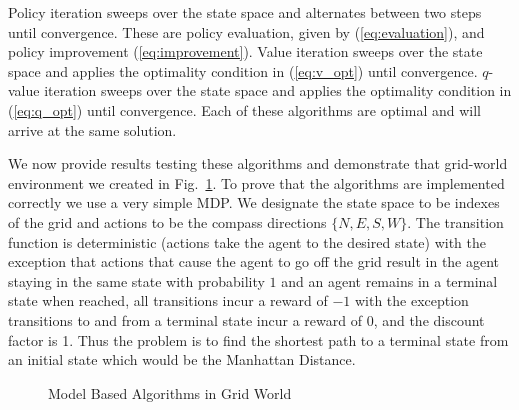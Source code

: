 \documentclass{article}
\begin{document}
Policy iteration sweeps over the state space and alternates between two steps until convergence. These are policy evaluation, given by (\ref{eq:evaluation}), and policy improvement (\ref{eq:improvement}). Value iteration sweeps over the state space and applies the optimality condition in (\ref{eq:v_opt}) until convergence. $q$-value iteration sweeps over the state space and applies the optimality condition in (\ref{eq:q_opt}) until convergence. Each of these algorithms are optimal and will arrive at the same solution.

We now provide results testing these algorithms and demonstrate that grid-world environment we created in Fig.~\ref{fig:model}. To prove that the algorithms are implemented correctly we use a very simple MDP. We designate the state space to be indexes of the grid and actions to be the compass directions $\{N, E, S, W\}$. The transition function is deterministic (actions take the agent to the desired state) with the exception that actions that cause the agent to go off the grid result in the agent staying in the same state with probability $1$ and an agent remains in a terminal state when reached, all transitions incur a reward of $-1$ with the exception transitions to and from a terminal state incur a reward of $0$, and the discount factor is 1. Thus the problem is to find the shortest path to a terminal state from an initial state which would be the Manhattan Distance.
\begin{figure}[H]
    \centering
    \caption{Model Based Algorithms in Grid World}
    \label{fig:model}
\end{figure}
\end{document}
